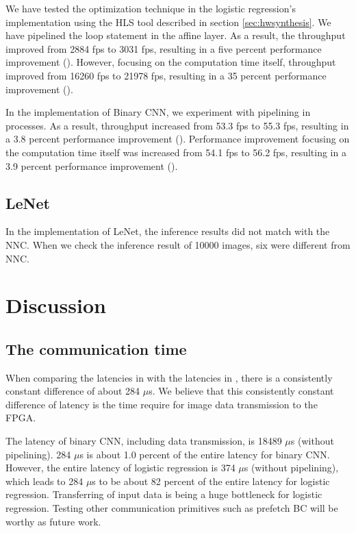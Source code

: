 We have tested the optimization technique in the logistic regression's implementation using the HLS tool described in section \ref{sec:hwsynthesis}. We have pipelined the loop statement in the affine layer. As a result, the throughput improved from 2884 fps to 3031 fps, resulting in a five percent performance improvement ().  However, focusing on the computation time itself, throughput improved from 16260 fps to 21978 fps, resulting in a 35 percent performance improvement ().

In the implementation of Binary CNN, we experiment with pipelining in processes. As a result, throughput increased from 53.3 fps to 55.3 fps, resulting in a 3.8 percent performance improvement (). Performance improvement focusing on the computation time itself was increased from 54.1 fps to 56.2 fps, resulting in a 3.9 percent performance improvement ().

\subsection{LeNet}
In the implementation of LeNet, the inference results did not match with the NNC. When we check the inference result of 10000 images, six were different from NNC.

\section{Discussion}
\subsection{The communication time}
When comparing the latencies in  with the latencies in , there is a consistently constant difference of about 284 $\mu$s. We believe that this consistently constant difference of latency is the time require for image data transmission to the FPGA.

The latency of binary CNN, including data transmission, is 18489 $\mu$s (without pipelining). 284 $\mu$s is about 1.0 percent of the entire latency for binary CNN. However, the entire latency of logistic regression is 374 $\mu$s (without pipelining), which leads to 284 $\mu$s to be about 82 percent of the entire latency for logistic regression. Transferring of input data is being a huge bottleneck for logistic regression. Testing other communication primitives such as prefetch BC will be worthy as future work.

